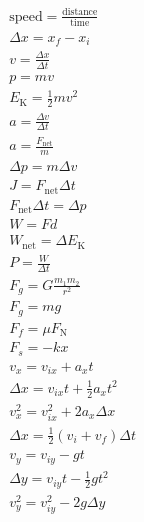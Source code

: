 \documentclass[dvipsnames]{article}
\begin{document}
\begin{multicols*}{4}
\setlength{\columnseprule}{1pt}




\begin{align*}
    & \mathrm{speed} = \frac{\mathrm{distance}}{\mathrm{time}} \\[1ex]
    & \Delta x = x_f - x_i \\[1ex]
    & v = \frac{\Delta x}{\Delta t} \\[1ex]
    & p = mv \\[1ex]
    & E_\mathrm{K} = \frac{1}{2} m v^2 \\[1ex]
    & a = \frac{\Delta v}{\Delta t} \\[1ex]
    & a = \frac{F_\mathrm{net}}{m} \\[1ex]
    & \Delta p = m \Delta v \\[1ex]
    & J = F_\mathrm{net} \Delta t \\[1ex]
    & F_\mathrm{net} \Delta t = \Delta p \\[1ex]
    & W = F d \\[1ex]
    & W_\mathrm{net} = \Delta E_\mathrm{K} \\[1ex]
    & P = \frac{W}{\Delta t} \\[1ex]
    & F_g = G \frac{m_1 m_2}{r^2} \\[1ex]
    & F_g = mg \\[1ex]
    & F_f = \mu F_\mathrm{N} \\[1ex]
    & F_s = - kx \\[1ex]
    & v_x = v_{ix} + a_x t \\[1ex]
    & \Delta x = v_{ix} t + \frac{1}{2} a_x t^2 \\[1ex]
    & v_x^2 = v_{ix}^2 + 2 a_x \Delta x \\[1ex]
    & \Delta x = \frac{1}{2}\left(v_i + v_f\right) \Delta t \\[1ex]
    & v_y = v_{iy} - g t \\[1ex]
    & \Delta y = v_{iy} t - \frac{1}{2} g t^2 \\[1ex]
    & v_y^2 = v_{iy}^2 - 2 g \Delta y \\[1ex]
\end{align*}



\end{multicols*}
\end{document}
